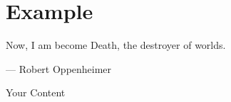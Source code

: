{\justifying
	\chapter{Example}
	\epigraph{Now, I am become Death, the destroyer of worlds.}{--- \textup{Robert Oppenheimer}}
	Your Content
}\cleanalldata